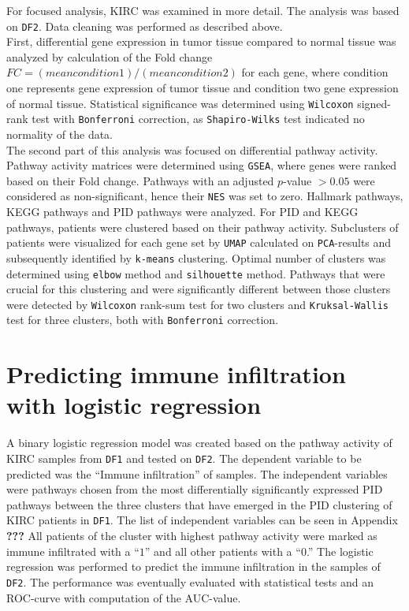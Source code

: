 \documentclass[
  parskip,
  oneside]{scrreprt}
\begin{document}
For focused analysis, KIRC was examined in more detail. The analysis was
based on \texttt{DF2}. Data cleaning was performed as described above.\\
First, differential gene expression in tumor tissue compared to normal
tissue was analyzed by calculation of the Fold change
\(FC =(mean condition 1) / (mean condition 2)\) for each gene, where
condition one represents gene expression of tumor tissue and condition
two gene expression of normal tissue. Statistical significance was
determined using \texttt{Wilcoxon} signed-rank test with
\texttt{Bonferroni} correction, as \texttt{Shapiro-Wilks} test indicated
no normality of the data.\\
The second part of this analysis was focused on differential pathway
activity. Pathway activity matrices were determined using \texttt{GSEA},
where genes were ranked based on their Fold change. Pathways with an
adjusted \(p\)-value \(>0.05\) were considered as non-significant, hence
their \texttt{NES} was set to zero. Hallmark pathways, KEGG pathways and
PID pathways were analyzed. For PID and KEGG pathways, patients were
clustered based on their pathway activity. Subclusters of patients were
visualized for each gene set by \texttt{UMAP} calculated on
\texttt{PCA}-results and subsequently identified by \texttt{k-means}
clustering. Optimal number of clusters was determined using
\texttt{elbow} method and \texttt{silhouette} method. Pathways that were
crucial for this clustering and were significantly different between
those clusters were detected by \texttt{Wilcoxon} rank-sum test for two
clusters and \texttt{Kruksal-Wallis} test for three clusters, both with
\texttt{Bonferroni} correction.

\hypertarget{predicting-immune-infiltration-with-logistic-regression}{%
\section{Predicting immune infiltration with logistic
regression}\label{predicting-immune-infiltration-with-logistic-regression}}

A binary logistic regression model was created based on the pathway
activity of KIRC samples from \texttt{DF1} and tested on \texttt{DF2}.
The dependent variable to be predicted was the ``Immune infiltration''
of samples. The independent variables were pathways chosen from the most
differentially significantly expressed PID pathways between the three
clusters that have emerged in the PID clustering of KIRC patients in
\texttt{DF1}. The list of independent variables can be seen in Appendix
\textbf{???} All patients of the cluster with highest pathway activity
were marked as immune infiltrated with a ``\(1\)'' and all other
patients with a ``\(0\).'' The logistic regression was performed to
predict the immune infiltration in the samples of \texttt{DF2}. The
performance was eventually evaluated with statistical tests and an
ROC-curve with computation of the AUC-value.
\end{document}
